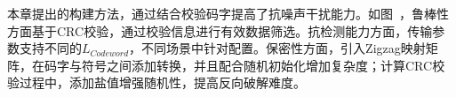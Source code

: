 本章提出的构建方法，通过结合校验码字提高了抗噪声干扰能力。如图\ ，鲁棒性方面基于CRC校验，通过校验信息进行有效数据筛选。抗检测能力方面，传输参数支持不同的$L_{Codeword}$，不同场景中针对配置。保密性方面，引入Zigzag映射矩阵，在码字与符号之间添加转换，并且配合随机初始化增加复杂度；计算CRC校验过程中，添加盐值增强随机性，提高反向破解难度。